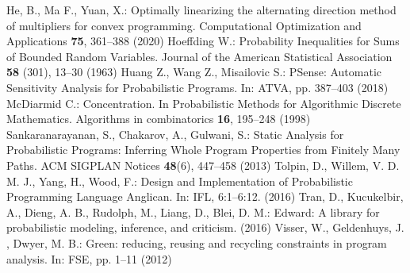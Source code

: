 \documentclass[runningheads]{llncs}
\begin{document}
\begin{thebibliography}{8}
He, B., Ma F., Yuan, X.: Optimally linearizing the alternating direction method of multipliers for convex programming. Computational Optimization and Applications \textbf{75}, 361--388 (2020)
Hoeffding W.: Probability Inequalities for Sums of Bounded Random Variables. Journal of the American Statistical Association \textbf{58} (301), 13--30 (1963)
Huang Z., Wang Z., Misailovic S.: PSense: Automatic Sensitivity Analysis for Probabilistic Programs. In: ATVA, pp. 387--403 (2018)
McDiarmid C.: Concentration. In Probabilistic Methods for Algorithmic Discrete Mathematics. Algorithms in combinatorics \textbf{16}, 195--248 (1998)
Sankaranarayanan, S., Chakarov, A., Gulwani, S.: Static Analysis for Probabilistic Programs: Inferring Whole Program Properties from Finitely Many Paths. ACM SIGPLAN Notices \textbf{48}(6), 447--458 (2013)
Tolpin, D., Willem, V. D. M. J., Yang, H., Wood, F.: Design and Implementation of Probabilistic Programming Language Anglican. In: IFL, 6:1–6:12. (2016)
Tran, D., Kucukelbir, A., Dieng, A. B., Rudolph, M., Liang, D., Blei, D. M.: Edward: A library for probabilistic modeling, inference, and criticism. (2016) 
Visser, W., Geldenhuys, J. , Dwyer, M. B.: Green: reducing, reusing and recycling constraints in program analysis. In: FSE, pp. 1--11 (2012)
\end{thebibliography}
\end{document}
